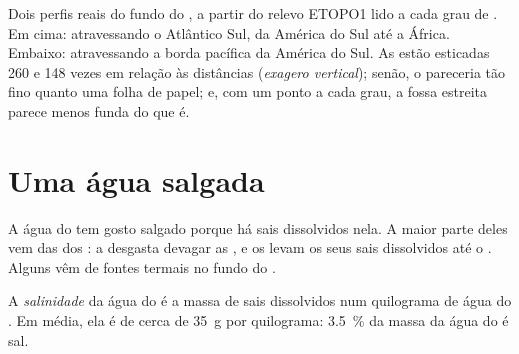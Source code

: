 \begin{omfigure}
{\small Dois perfis reais do fundo do , a partir do relevo ETOPO1
lido a cada grau de . Em cima: atravessando o Atlântico Sul, da
América do Sul até a África. Embaixo: atravessando a borda pacífica da
América do Sul. As  estão esticadas 260 e 148 vezes em relação às
distâncias (\emph{exagero vertical}); senão, o  pareceria tão fino
quanto uma folha de papel; e, com um ponto a cada grau, a fossa estreita
parece menos funda do que é.}
\label{fig:g8:the-oceans:profiles}
\end{omfigure}


\section{Uma água salgada}

A água do  tem gosto salgado porque há sais dissolvidos nela. A maior
parte deles vem das  dos : a  desgasta devagar as
, e os  levam os seus sais dissolvidos até o . Alguns vêm de
fontes termais no fundo do .

\begin{definition}[Salinidade]\label{def:g8:the-oceans:salinity}
A \emph{salinidade} da água do  é a massa de sais
dissolvidos num quilograma de água do . Em média, ela é de cerca de
\qty{35}{g} por quilograma: \qty{3.5}{\%} da massa da água do  é
sal.
\end{definition}

